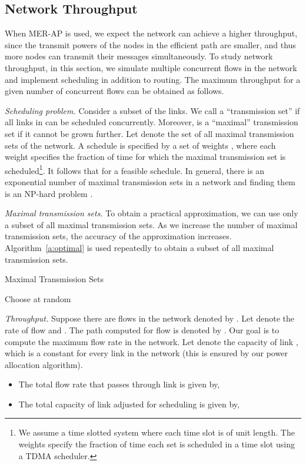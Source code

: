 \documentclass[10pt,journal]{IEEEtran}
\theoremstyle{definition}
\begin{document}
\subsection{Network Throughput}
When  MER-AP is used, we expect  the network can achieve a higher  throughput, since the transmit powers of the nodes in the efficient path are smaller, and thus more nodes can transmit their messages simultaneously.  
To study network throughput, in this section, we simulate multiple concurrent flows in the network and implement scheduling in addition to routing.
The maximum  throughput for a given number of concurrent flows can be obtained as follows.

\textit{Scheduling problem.}
Consider a subset  of the links. 
We call  a ``transmission set'' if all links in  can be scheduled concurrently. 
Moreover,  is a ``maximal'' transmission set if it cannot be grown further. Let  denote the set of all maximal transmission sets of the network. A schedule is specified by a set of weights , where each weight  specifies the fraction of time for which the maximal transmission set  is scheduled\footnote{We assume a time slotted system where each time slot is of unit length. The weights  specify the fraction of time each set  is scheduled in a time slot using a TDMA scheduler.}. It follows that  for a feasible schedule. In general, there is an exponential number of maximal transmission sets in a network and finding them is an NP-hard problem \cite{lawler1980generating}.

\textit{Maximal transmission sets.}
To obtain a practical approximation, we can use only a subset of all maximal transmission sets. As we increase the number of maximal transmission sets, the accuracy of the approximation increases. Algorithm~\ref{a:optimal} is used repeatedly to obtain a subset of all maximal transmission sets. 


\begin{algorithm}
\caption{Maximal Transmission Sets}
\begin{algorithmic}[1]
\STATE 
\WHILE{}
	\STATE Choose  at random
	\STATE 
		\STATE 
	\ENDIF
\ENDWHILE
\RETURN 
\end{algorithmic}
\label{a:optimal}
\end{algorithm}

\textit{Throughput.}
Suppose there are  flows in the network denoted by . Let  denote the rate of flow  and . The  path computed for flow  is denoted by . Our goal is to compute the maximum flow rate in the network. Let  denote the capacity of link , which is a constant for every link in the network (this is ensured by our power allocation algorithm).
\begin{itemize}
\item
The total flow rate that passes through link  is given by,

\item
The total capacity of link  adjusted for scheduling is given by,

\end{itemize}
\end{document}
